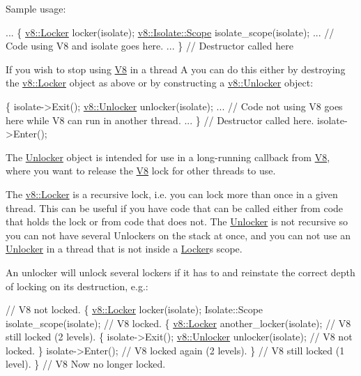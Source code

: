 Sample usage\+: 
\begin{DoxyCode}
...
\{
  \hyperlink{classv8_1_1_locker}{v8::Locker} locker(isolate);
  \hyperlink{classv8_1_1_isolate_1_1_scope}{v8::Isolate::Scope} isolate\_scope(isolate);
  ...
  \textcolor{comment}{// Code using V8 and isolate goes here.}
  ...
\} \textcolor{comment}{// Destructor called here}
\end{DoxyCode}


If you wish to stop using \hyperlink{classv8_1_1_v8}{V8} in a thread A you can do this either by destroying the \hyperlink{classv8_1_1_locker}{v8\+::\+Locker} object as above or by constructing a \hyperlink{classv8_1_1_unlocker}{v8\+::\+Unlocker} object\+:


\begin{DoxyCode}
\{
  isolate->Exit();
  \hyperlink{classv8_1_1_unlocker}{v8::Unlocker} unlocker(isolate);
  ...
  \textcolor{comment}{// Code not using V8 goes here while V8 can run in another thread.}
  ...
\} \textcolor{comment}{// Destructor called here.}
isolate->Enter();
\end{DoxyCode}


The \hyperlink{classv8_1_1_unlocker}{Unlocker} object is intended for use in a long-\/running callback from \hyperlink{classv8_1_1_v8}{V8}, where you want to release the \hyperlink{classv8_1_1_v8}{V8} lock for other threads to use.

The \hyperlink{classv8_1_1_locker}{v8\+::\+Locker} is a recursive lock, i.\+e. you can lock more than once in a given thread. This can be useful if you have code that can be called either from code that holds the lock or from code that does not. The \hyperlink{classv8_1_1_unlocker}{Unlocker} is not recursive so you can not have several Unlockers on the stack at once, and you can not use an \hyperlink{classv8_1_1_unlocker}{Unlocker} in a thread that is not inside a \hyperlink{classv8_1_1_locker}{Locker}\textquotesingle{}s scope.

An unlocker will unlock several lockers if it has to and reinstate the correct depth of locking on its destruction, e.\+g.\+:


\begin{DoxyCode}
\textcolor{comment}{// V8 not locked.}
\{
  \hyperlink{classv8_1_1_locker}{v8::Locker} locker(isolate);
  Isolate::Scope isolate\_scope(isolate);
  \textcolor{comment}{// V8 locked.}
  \{
    \hyperlink{classv8_1_1_locker}{v8::Locker} another\_locker(isolate);
    \textcolor{comment}{// V8 still locked (2 levels).}
    \{
      isolate->Exit();
      \hyperlink{classv8_1_1_unlocker}{v8::Unlocker} unlocker(isolate);
      \textcolor{comment}{// V8 not locked.}
    \}
    isolate->Enter();
    \textcolor{comment}{// V8 locked again (2 levels).}
  \}
  \textcolor{comment}{// V8 still locked (1 level).}
\}
\textcolor{comment}{// V8 Now no longer locked.}
\end{DoxyCode}
 

